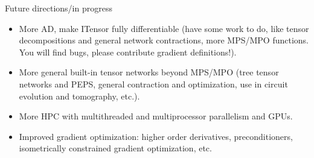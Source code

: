 \begin{frame}{Future directions/in progress}

\begin{itemize}[<+->]

  \item More AD, make ITensor fully differentiable (have some work to do, like tensor decompositions and general network contractions, more MPS/MPO functions. You will find bugs, please contribute gradient definitions!).
  \item More general built-in tensor networks beyond MPS/MPO (tree tensor networks and PEPS, general contraction and optimization, use in circuit evolution and tomography, etc.).
  \item More HPC with multithreaded and multiprocessor parallelism and GPUs.
  \item Improved gradient optimization: higher order derivatives, preconditioners, isometrically constrained gradient optimization, etc.

\end{itemize}

\end{frame}
